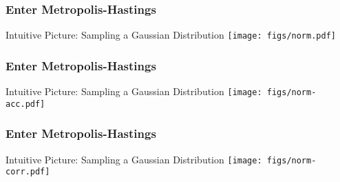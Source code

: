 \documentclass[mathserif]{beamer}
\begin{document}
\begin{frame}
\frametitle{Enter Metropolis-Hastings}
\begin{block}{Intuitive Picture: Sampling a Gaussian Distribution}
\centering
  \texttt{[image: figs/norm.pdf]}
\end{block}

\end{frame}

\begin{frame}
\frametitle{Enter Metropolis-Hastings}

\begin{block}{Intuitive Picture: Sampling a Gaussian Distribution}
\centering
  \texttt{[image: figs/norm-acc.pdf]}
\end{block}

\end{frame}

\begin{frame}
\frametitle{Enter Metropolis-Hastings}

\begin{block}{Intuitive Picture: Sampling a Gaussian Distribution}
\centering
  \texttt{[image: figs/norm-corr.pdf]}
\end{block}

\end{frame}
\end{document}
